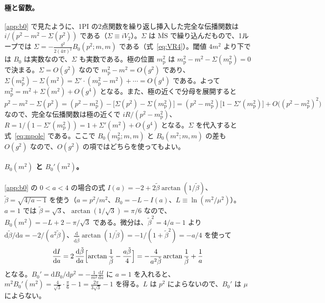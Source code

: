 \documentclass[a4paper,10pt]{ltjsarticle}
\newcommand{\dd}{\mathrm{d}}
\begin{document}
\paragraph{極と留数。}\ref{app:b0} で見たように、1PI の2点関数を繰り返し挿入した完全な伝播関数は $i/(p^2-m^2-\Sigma(p^2))$ である（$\Sigma\equiv iV_2$）。$\Sigma$ は $\overline{\mathrm{MS}}$ で繰り込んだもので、1ループでは $\Sigma=-\frac{g^2}{2(4\pi)^2}B_0(p^2;m,m)$ である（式~\eqref{eq:VR4}）。閾値 $4m^2$ より下では $B_0$ は実数なので、$\Sigma$ も実数である。極の位置 $m_{\mathrm p}^2$ は $m_{\mathrm p}^2-m^2-\Sigma(m_{\mathrm p}^2)=0$ で決まる。$\Sigma=O(g^2)$ なので $m_{\mathrm p}^2-m^2=O(g^2)$ であり、$\Sigma(m_{\mathrm p}^2)-\Sigma(m^2)=\Sigma'\cdot(m_{\mathrm p}^2-m^2)+\cdots=O(g^4)$ である。よって $m_{\mathrm p}^2=m^2+\Sigma(m^2)+O(g^4)$ となる。また、極の近くで分母を展開すると
\begin{equation*}
p^2-m^2-\Sigma(p^2)=(p^2-m_{\mathrm p}^2)-\bigl[\Sigma(p^2)-\Sigma(m_{\mathrm p}^2)\bigr]=(p^2-m_{\mathrm p}^2)\bigl[1-\Sigma'(m_{\mathrm p}^2)\bigr]+O\bigl((p^2-m_{\mathrm p}^2)^2\bigr)
\end{equation*}
なので、完全な伝播関数は極の近くで $iR/(p^2-m_{\mathrm p}^2)$、$R=1/(1-\Sigma'(m_{\mathrm p}^2))=1+\Sigma'(m^2)+O(g^4)$ となる。$\Sigma$ を代入すると式~\eqref{eq:mpole} である。ここで $B_0(m_{\mathrm p}^2;m,m)$ と $B_0(m^2;m,m)$ の差も $O(g^2)$ なので、$O(g^2)$ の項ではどちらを使ってもよい。

\paragraph{$B_0(m^2)$ と $B_0'(m^2)$。}\ref{app:b0} の $0<a<4$ の場合の式 $I(a)=-2+2\tilde\beta\arctan(1/\tilde\beta)$、$\tilde\beta=\sqrt{4/a-1}$ を使う（$a=p^2/m^2$、$B_0=-L-I(a)$、$L\equiv\ln(m^2/\mu^2)$）。$a=1$ では $\tilde\beta=\sqrt3$、$\arctan(1/\sqrt3)=\pi/6$ なので、$B_0(m^2)=-L+2-\pi/\sqrt3$ である。微分は、$\tilde\beta^2=4/a-1$ より $\dd\tilde\beta/\dd a=-2/(a^2\tilde\beta)$、$\frac{\dd}{\dd\tilde\beta}\arctan(1/\tilde\beta)=-1/(1+\tilde\beta^2)=-a/4$ を使って
\begin{equation*}
\frac{\dd I}{\dd a}=2\,\frac{\dd\tilde\beta}{\dd a}\Bigl[\arctan\frac1{\tilde\beta}-\frac{a\tilde\beta}{4}\Bigr]=-\frac{4}{a^2\tilde\beta}\arctan\frac1{\tilde\beta}+\frac1a
\end{equation*}
となる。$B_0'=\dd B_0/\dd p^2=-\frac1{m^2}\frac{\dd I}{\dd a}$ に $a=1$ を入れると、$m^2B_0'(m^2)=\frac{4}{\sqrt3}\cdot\frac\pi6-1=\frac{2\pi}{3\sqrt3}-1$ を得る。$L$ は $p^2$ によらないので、$B_0'$ は $\mu$ によらない。
\end{document}
